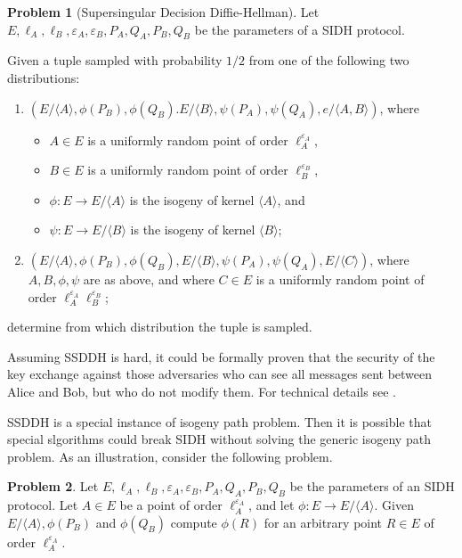 \documentclass{article}
\theoremstyle{theorem}
\theoremstyle{definition}
\newtheorem{problem}{Problem}
\begin{document}
\begin{problem}[Supersingular Decision Diffie-Hellman]
	Let $E, \ell_A, \ell_B, \varepsilon_A, \varepsilon_B, P_A, Q_A, P_B, Q_B$ be the parameters of a SIDH protocol.
	
	Given a tuple sampled with probability  $1/2$ from one of the following two distributions:
	\begin{enumerate}
		\item $(E/\langle A \rangle, \phi(P_B), \phi(Q_B). E/\langle B \rangle, \psi(P_A), \psi(Q_A), e/\langle A, B \rangle)$, where
				
				\begin{itemize}
					\item $A \in E$ is a uniformly random point of order $\ell_A^{\varepsilon_A}$,
					
					\item $B \in E$ is a uniformly random point of order $\ell_B^{\varepsilon_B}$,
					
					\item $\phi: E \to E/\langle A \rangle$ is the isogeny of kernel $\langle A \rangle$, and
					
					\item $\psi: E \to E/\langle B \rangle$ is the isogeny of kernel $\langle B \rangle$;
				\end{itemize}
			
		\item $(E/\langle A \rangle, \phi(P_B), \phi(Q_B), E/\langle	B \rangle, \psi(P_A), \psi(Q_A), E/\langle C \rangle)$, where $A, B, \phi, \psi$ are as above, and where $C \in E$ is a uniformly random point of order $\ell_A^{\varepsilon_A}\ell_B^{\varepsilon_B}$;
	\end{enumerate}
	determine from which distribution the tuple is sampled.
\end{problem}

Assuming SSDDH is hard, it could be formally proven that the security of the key exchange against those adversaries who can see all messages sent between Alice and Bob, but who do not modify them. For technical details see \cite{TowardsQuantumRes}.

SSDDH is a special instance of isogeny path problem. Then it is possible that special slgorithms could break SIDH without solving the generic isogeny path problem. As an illustration, consider the following problem.

\begin{problem}
	Let $E, \ell_A, \ell_B, \varepsilon_A, \varepsilon_B, P_A, Q_A, P_B, Q_B$ be the parameters of an SIDH protocol. 
	Let $A \in E$ be a point of order $\ell_A^{\varepsilon_A}$, and let $\phi: E \to E/\langle A \rangle$. Given $E/\langle A \rangle, \phi(P_B)$ and $\phi(Q_B)$ compute $\phi(R)$ for an arbitrary point $R \in E$ of order $\ell_A^{\varepsilon_A}$.
\end{problem}
\end{document}

